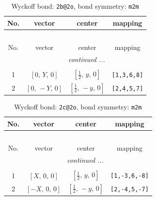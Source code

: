 \documentclass[fleqn,8pt]{jsarticle}
\begin{document}
\renewcommand{\arraystretch}{1.2}
\begin{longtable}{cccc}
\caption{Wyckoff bond: {\tt 2b@2o}, bond symmetry: {\tt m2m}}
 \\
 \hline \hline
No. & vector & center & mapping \\ \hline \endfirsthead

\multicolumn{3}{l}{\tablename\ \thetable{}} \\
 \hline \hline
No. & vector & center & mapping \\ \hline \endhead

 \hline \hline
\multicolumn{3}{r}{\footnotesize\it continued ...} \\ \endfoot

 \hline \hline
\multicolumn{3}{r}{} \\ \endlastfoot

1 & $\left[ 0,\, Y,\, 0 \right]$ & $\left[ \frac{1}{2},\, y,\, 0 \right]$ & {\tt [1,3,6,8]} \\ \hline
2 & $\left[ 0,\, - Y,\, 0 \right]$ & $\left[ \frac{1}{2},\, - y,\, 0 \right]$ & {\tt [2,4,5,7]} \\
\end{longtable}
\renewcommand{\arraystretch}{1.2}
\begin{longtable}{cccc}
\caption{Wyckoff bond: {\tt 2c@2o}, bond symmetry: {\tt m2m}}
 \\
 \hline \hline
No. & vector & center & mapping \\ \hline \endfirsthead

\multicolumn{3}{l}{\tablename\ \thetable{}} \\
 \hline \hline
No. & vector & center & mapping \\ \hline \endhead

 \hline \hline
\multicolumn{3}{r}{\footnotesize\it continued ...} \\ \endfoot

 \hline \hline
\multicolumn{3}{r}{} \\ \endlastfoot

1 & $\left[ X,\, 0,\, 0 \right]$ & $\left[ \frac{1}{2},\, y,\, 0 \right]$ & {\tt [1,-3,6,-8]} \\ \hline
2 & $\left[ - X,\, 0,\, 0 \right]$ & $\left[ \frac{1}{2},\, - y,\, 0 \right]$ & {\tt [2,-4,5,-7]} \\
\end{longtable}
\renewcommand{\arraystretch}{1.2}
\end{document}
